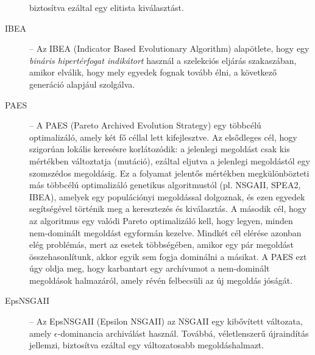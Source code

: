 \begin{description}
            biztosítva ezáltal egy elitista kiválasztást.
      \item[IBEA] -- Az IBEA (Indicator Based Evolutionary Algorithm) \cite{zitzler2004indicator} alapötlete, hogy egy \textit{bináris hipertérfogat indikátort} használ a szelekciós eljárás szakaszában,
            amikor elválik, hogy mely egyedek fognak tovább élni, a következő generáció alapjául szolgálva.
      \item[PAES] -- A PAES (Pareto Archived Evolution Strategy) \cite{knowles1999pareto} egy többcélú optimalizáló, amely két fő céllal lett kifejlesztve.
            Az elsődleges cél, hogy szigorúan lokális keresésre korlátozódik: a jelenlegi megoldást csak kis mértékben változtatja (mutáció),
            ezáltal eljutva a jelenlegi megoldástól egy szomszédos megoldásig. Ez a folyamat jelentős mértékben megkülönbözteti más többcélú optimalizáló genetikus algoritmustól (pl. NSGAII, SPEA2, IBEA),
            amelyek egy populációnyi megoldással dolgoznak, és ezen egyedek segítségével történik meg a keresztezés és kiválasztás.
            A második cél, hogy az algoritmus egy valódi Pareto optimalizáló kell, hogy legyen, minden nem-dominált megoldást egyformán kezelve.
            Mindkét cél elérése azonban elég problémás, mert az esetek többségében, amikor egy pár megoldást összehasonlítunk, akkor egyik sem fogja dominálni a másikat.
            A PAES ezt úgy oldja meg, hogy karbantart egy archívumot a nem-dominált megoldások halmazáról, amely révén felbecsüli az új megoldás jóságát.
      \item[EpsNSGAII] -- Az EpsNSGAII (Epsilon NSGAII) \cite{kollat2005value} az NSGAII egy kibővített változata, amely $\epsilon$-dominancia archiválást használ.
            Továbbá, véletlenszerű újraindítás jellemzi, biztosítva ezáltal egy változatosabb megoldáshalmazt.
\end{description}
